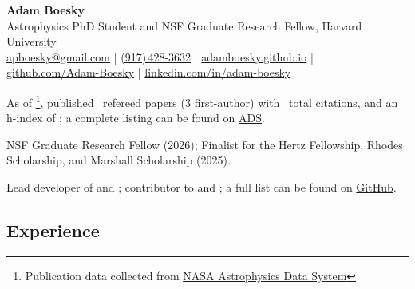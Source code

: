 \documentclass[11pt,letterpaper]{article}
\begin{document}
\thispagestyle{empty}\sloppy\sloppypar\raggedbottom

\textbf{\Large Adam Boesky} \\[0.5ex]
Astrophysics PhD Student and NSF Graduate Research Fellow, Harvard University \\
\textsf{\small %
\href{mailto:apboesky@gmail.com}{apboesky@gmail.com} | %
\href{tel:+1-917-428-3632}{(917)\,428-3632} | %
\href{https://adamboesky.github.io}{adamboesky.github.io} | %
\href{https://github.com/Adam-Boesky}{github.com/Adam-Boesky} | %
\href{https://www.linkedin.com/in/adam-boesky}{linkedin.com/in/adam-boesky} %
}\\[0.5ex]

\vspace{1ex}
\begin{list}{}{\cvlist}
    \item As of \pubsdate\footnote{Publication data collected from \href{https://ui.adsabs.harvard.edu/}{NASA Astrophysics Data System}}, published \pubsnumber\ refereed papers (3 first-author) with \pubscitations\ total citations, and an h-index of \pubshindex; a complete listing can be found on \href{https://ui.adsabs.harvard.edu/public-libraries/Ik0OjllsTWCtf7RzDpNJFQ}{ADS}.
    \item NSF Graduate Research Fellow (2026); Finalist for the Hertz Fellowship, Rhodes Scholarship, and Marshall Scholarship (2025).
    \item Lead developer of \href{https://github.com/Adam-Boesky/astro_SPLASH}{} and \href{https://github.com/Adam-Boesky/ztforce}{}; contributor to \href{https://github.com/TeamCOMPAS/COMPAS}{} and \href{https://github.com/alexandergagliano/Prost}{}; a full list can be found on \href{https://github.com/Adam-Boesky}{GitHub}.
\end{list}

\subsection{Experience}
\end{document}
